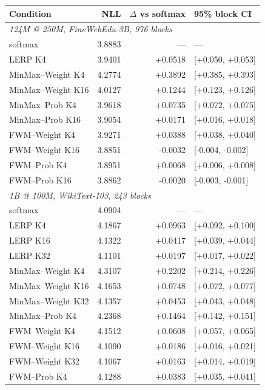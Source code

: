 \begin{tabular}{lrrl}
\toprule
Condition & NLL & $\Delta$ vs softmax & 95\% block CI \\
\midrule
\multicolumn{4}{l}{\emph{124M @ 250M, FineWebEdu-3B, 976 blocks}} \\
softmax & 3.8883 & --- & --- \\
LERP K4 & 3.9401 & +0.0518 & [+0.050, +0.053] \\
MinMax--Weight K4 & 4.2774 & +0.3892 & [+0.385, +0.393] \\
MinMax--Weight K16 & 4.0127 & +0.1244 & [+0.123, +0.126] \\
MinMax--Prob K4 & 3.9618 & +0.0735 & [+0.072, +0.075] \\
MinMax--Prob K16 & 3.9054 & +0.0171 & [+0.016, +0.018] \\
FWM--Weight K4 & 3.9271 & +0.0388 & [+0.038, +0.040] \\
FWM--Weight K16 & 3.8851 & -0.0032 & [-0.004, -0.002] \\
FWM--Prob K4 & 3.8951 & +0.0068 & [+0.006, +0.008] \\
FWM--Prob K16 & 3.8862 & -0.0020 & [-0.003, -0.001] \\
\midrule
\multicolumn{4}{l}{\emph{1B @ 100M, WikiText-103, 243 blocks}} \\
softmax & 4.0904 & --- & --- \\
LERP K4 & 4.1867 & +0.0963 & [+0.092, +0.100] \\
LERP K16 & 4.1322 & +0.0417 & [+0.039, +0.044] \\
LERP K32 & 4.1101 & +0.0197 & [+0.017, +0.022] \\
MinMax--Weight K4 & 4.3107 & +0.2202 & [+0.214, +0.226] \\
MinMax--Weight K16 & 4.1653 & +0.0748 & [+0.072, +0.077] \\
MinMax--Weight K32 & 4.1357 & +0.0453 & [+0.043, +0.048] \\
MinMax--Prob K4 & 4.2368 & +0.1464 & [+0.142, +0.151] \\
FWM--Weight K4 & 4.1512 & +0.0608 & [+0.057, +0.065] \\
FWM--Weight K16 & 4.1090 & +0.0186 & [+0.016, +0.021] \\
FWM--Weight K32 & 4.1067 & +0.0163 & [+0.014, +0.019] \\
FWM--Prob K4 & 4.1288 & +0.0383 & [+0.035, +0.041] \\
\bottomrule
\end{tabular}\hfill
